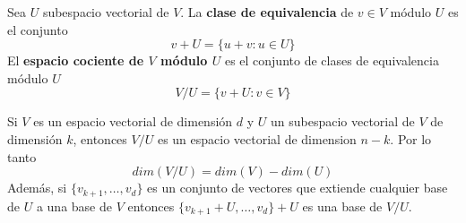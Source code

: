 \begin{defi}
	Sea $U$ subespacio vectorial de $V$. La \textbf{clase de equivalencia} de $v \in V$ módulo $U$ es el conjunto
	\[
	v+U=\lbrace u+v: u \in U\rbrace
	\]
	El \textbf{espacio cociente de $V$ módulo $U$} es el conjunto de clases de equivalencia módulo $U$
	\[
	V/U = \lbrace v+U : v \in V\rbrace
	\]
\end{defi}

\begin{theorem}
	Si $V$ es un espacio vectorial de dimensión $d$ y $U$ un subespacio vectorial de $V$ de dimensión $k$, entonces $V/U$ es un espacio vectorial de dimension $n-k$. Por lo tanto
	\[
	dim(V/U)=dim(V) - dim (U)
	\]
	Además, si $\lbrace v_{k+1},\ldots,v_d\rbrace$ es un conjunto de vectores que extiende cualquier base de $U$ a una base de $V$ entonces $\lbrace v_{k+1}+U,\ldots,v_d\rbrace+U$ es una base de $V/U$.
\end{theorem}